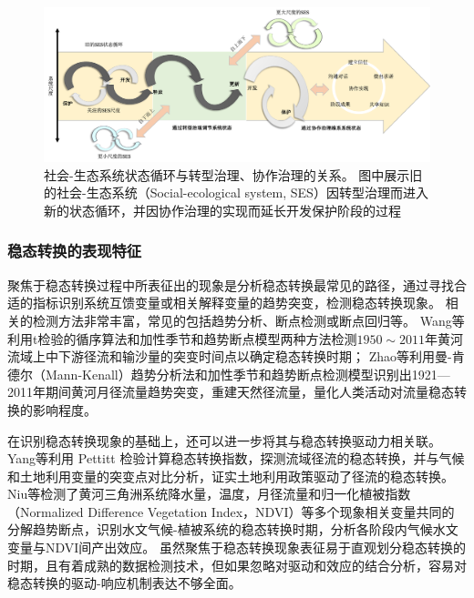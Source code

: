 \begin{figure}[htb] %
    \includegraphics[width=\textwidth]{img/ch1/ch1_governance_driver.png}
    \caption[社会-生态系统状态循环]{社会-生态系统状态循环与转型治理、协作治理的关系。
    图中展示旧的社会-生态系统（Social-ecological system, SES）因转型治理而进入新的状态循环，并因协作治理的实现而延长开发保护阶段的过程}\label{ch1:fig:governance_driver}
\end{figure}

\subsubsection{稳态转换的表现特征}

聚焦于稳态转换过程中所表征出的现象是分析稳态转换最常见的路径，通过寻找合适的指标识别系统互馈变量或相关解释变量的趋势突变，检测稳态转换现象。
相关的检测方法非常丰富，常见的包括趋势分析、断点检测或断点回归等。
Wang等利用t检验的循序算法和加性季节和趋势断点模型两种方法检测$1950 \sim 2011$年黄河流域上中下游径流和输沙量的突变时间点以确定稳态转换时期\cite{wang2014}；
Zhao等利用曼-肯德尔（Mann-Kenall）趋势分析法和加性季节和趋势断点检测模型识别出1921—2011年期间黄河月径流量趋势突变，重建天然径流量，量化人类活动对流量稳态转换的影响程度\cite{zhao2015}。

在识别稳态转换现象的基础上，还可以进一步将其与稳态转换驱动力相关联。
Yang等利用 Pettitt 检验计算稳态转换指数，探测流域径流的稳态转换，并与气候和土地利用变量的突变点对比分析，证实土地利用政策驱动了径流的稳态转换\cite{yang2012a}。
Niu等检测了黄河三角洲系统降水量，温度，月径流量和归一化植被指数（Normalized Difference Vegetation Index，NDVI）等多个现象相关变量共同的分解趋势断点，识别水文气候-植被系统的稳态转换时期，分析各阶段内气候水文变量与NDVI间产出效应\cite{niu2020}。
虽然聚焦于稳态转换现象表征易于直观划分稳态转换的时期，且有着成熟的数据检测技术，但如果忽略对驱动和效应的结合分析，容易对稳态转换的驱动-响应机制表达不够全面。


